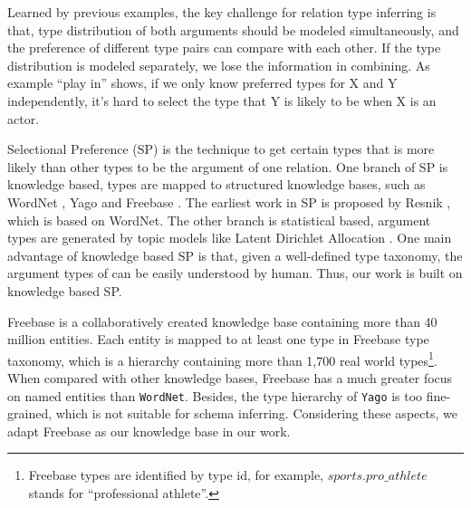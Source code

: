 Learned by previous examples, the key challenge for relation type inferring is that, type distribution of both arguments
should be modeled simultaneously, and the preference of different type pairs can compare with each other.
If the type distribution is modeled separately, we lose the information in combining. As example ``play in'' shows, if we only know
preferred types for X and Y independently, it's hard to select the type that Y is likely to be when X is an actor.

Selectional Preference (SP) is the technique to get certain types that is more likely than other
types to be the argument of one relation.
One branch of SP is knowledge based, types are mapped to structured knowledge bases, such as WordNet \cite{miller1995wordnet}, Yago \cite{suchanek2007WWW} and Freebase \cite{bollacker2008freebase}. The earliest work in SP is proposed by Resnik , which is based on WordNet.
The other branch is statistical based, argument types are generated by topic models like Latent Dirichlet
Allocation \cite{blei2003latent}.
One main advantage of knowledge based SP is that, given a well-defined type taxonomy, the argument types of can be easily understood by human.
Thus, our work is built on knowledge based SP.

Freebase is a collaboratively created knowledge base containing more than 40 million entities. Each entity is mapped to at least
one type in Freebase type taxonomy, which is a hierarchy containing more than 1,700 real world types\footnote{Freebase types are identified by type id, for example, $sports.pro\_athlete$ stands for ``professional athlete''.}.
When compared with other knowledge bases, Freebase has a much greater focus on named entities than {\tt WordNet}. Besides, the type hierarchy of {\tt Yago} is too fine-grained, which is not suitable for schema inferring. Considering these aspects, we adapt Freebase as our knowledge base in our work.

%
%


